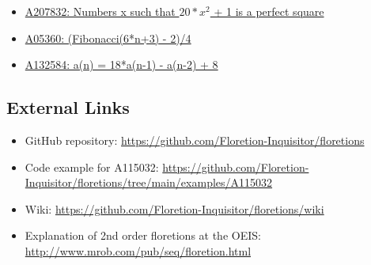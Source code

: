 \documentclass[12pt]{article}
\begin{document}
\begin{itemize}
  \item  \href{https://oeis.org/A207832}{ A207832: Numbers x such that $20*x^2$ + 1 is a perfect square} 
  \item \href{https://oeis.org/A053606}{ A05360: (Fibonacci(6*n+3) - 2)/4 }    
  \item \href{https://oeis.org/A132584}{A132584: a(n) = 18*a(n-1) - a(n-2) + 8 }   
 \end{itemize}
		 

\subsection{External Links}

\begin{itemize}
  \item GitHub repository: \url{https://github.com/Floretion-Inquisitor/floretions}
  \item Code example for A115032: \url{https://github.com/Floretion-Inquisitor/floretions/tree/main/examples/A115032}
  \item Wiki: \url{https://github.com/Floretion-Inquisitor/floretions/wiki}
  \item Explanation of 2nd order floretions at the OEIS: \url{http://www.mrob.com/pub/seq/floretion.html}

\end{itemize}

 
\end{document}
